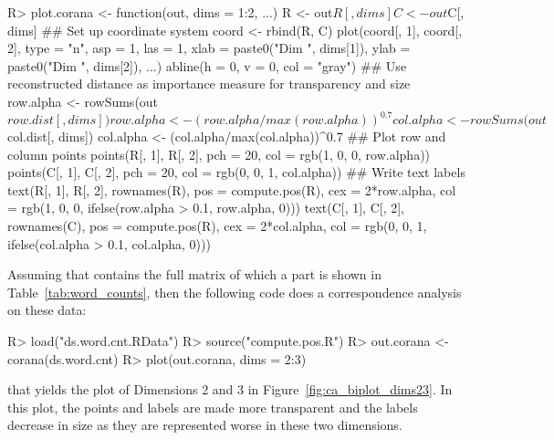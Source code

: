 \documentclass[article]{jdssv}
\begin{document}
\begin{Schunk}
\begin{Sinput}
R> plot.corana <- function(out, dims = 1:2, ...){
      R <- out$R[, dims]
      C <- out$C[, dims]
      ## Set up coordinate system
      coord <- rbind(R, C)
      plot(coord[, 1], coord[, 2], type = "n", asp = 1, las = 1,
           xlab = paste0("Dim ", dims[1]), ylab = paste0("Dim ", dims[2]), ...)
      abline(h = 0, v = 0, col = "gray")
      ## Use reconstructed distance as importance measure for transparency and size
      row.alpha <- rowSums(out$row.dist[, dims])
      row.alpha <- (row.alpha/max(row.alpha))^0.7
      col.alpha <- rowSums(out$col.dist[, dims])
      col.alpha <- (col.alpha/max(col.alpha))^0.7
      ## Plot row and column points 
      points(R[, 1], R[, 2], pch = 20, col = rgb(1, 0, 0, row.alpha))
      points(C[, 1], C[, 2], pch = 20, col = rgb(0, 0, 1, col.alpha))
      ## Write text labels
      text(R[, 1], R[, 2], rownames(R), pos = compute.pos(R), cex = 2*row.alpha,
           col = rgb(1, 0, 0, ifelse(row.alpha > 0.1, row.alpha, 0)))
      text(C[, 1], C[, 2], rownames(C), pos = compute.pos(R), cex = 2*col.alpha,
           col = rgb(0, 0, 1, ifelse(col.alpha > 0.1, col.alpha, 0)))
    }
\end{Sinput}
\end{Schunk}
Assuming that  contains the full matrix of which a part is shown in Table~\ref*{tab:word_counts}, then the following code does a correspondence analysis on these data:
\begin{Schunk}
\begin{Sinput}
R> load("ds.word.cnt.RData")
R> source("compute.pos.R")
R> out.corana <- corana(ds.word.cnt)
R> plot(out.corana, dims = 2:3)
\end{Sinput}
\end{Schunk}
that yields the plot of Dimensions 2 and 3 in Figure~\ref{fig:ca_biplot_dims23}. In this plot, the points and labels are made more transparent and the labels decrease in size as they are represented worse in these two dimensions.

\end{document}
